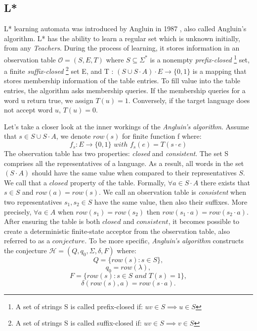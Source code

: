 \subsection{L*}
L* learning automata was introduced by Angluin in 1987 \cite{ANGLUIN198787},
also called Angluin's algorithm.
L* has the ability to learn a 
regular set which is unknown initially, from any \textit{Teachers}.
During the process of learning, it stores
information in an observation table 
$\mathcal{O} = (S, E, T)$ where $S \subseteq \Sigma^*$ is a nonempty
\textit{prefix-closed} \footnote{A set of strings S is called prefix-closed if: $uv \in S \implies u \in S$} set, 
a finite \textit{suffix-closed} \footnote{A set of strings S is called suffix-closed if: $uv \in S \implies v \in S$} set E,
and T : $(S \cup S \cdot A) \cdot E \rightarrow \lbrace 0, 1 \rbrace$ 
is a mapping that stores membership information of the table entries.
To fill value into the table entries, the algorithm asks membership queries. 
If the membership queries for a word u return true, we assign $T(u) = 1$. 
Conversely, if the target language does not accept word $u$, $T(u) = 0$.

Let's take a closer look at the inner workings of the \textit{Angluin's algorithm}.
Assume that $s \in S \cup S \cdot A$, we denote $row(s)$ for finite function f where:
\[
  f_s : E \rightarrow \lbrace 0, 1 \rbrace \,\, with \,\, f_s(e) = T(s \cdot e)  
\]
The observation table has two properties: \textit{closed} and \textit{consistent}.
The set S comprises all the representatives of a language. 
As a result, all words in the set $(S \cdot A)$ should have the same value when compared to their representatives $S$.
We call that a $closed$ property of the table.
Formally, $\forall a \in S \cdot A$ there exists that $s \in S $ and $row(a) = row(s)$.
We call an observation table is \textit{consistent} when two representatives $s_1, s_2 \in S$
have the same value, then also their suffixes.
More precisely, $\forall a \in A$ when $row(s_1) = row(s_2)$ then $row(s_1 \cdot a) = row(s_2 \cdot a)$.
After ensuring the table is both $closed$ and $consistent$, it becomes possible to create a deterministic finite-state acceptor from the observation table, also referred to as a $conjecture$.
To be more specific, \textit{Angluin's algorithm} constructs the conjecture 
$\mathcal{H} = (Q, q_0, \Sigma, \delta, F)$ where:
\[
  Q = \lbrace row(s): s \in S \rbrace,
\]
\[
  q_0 = row(\lambda),
\]
\[
  F = \lbrace row(s): s \in S \,\, and \,\, T(s)  = 1\rbrace,
\]
\[
  \delta(row(s),a) = row(s \cdot a).
\]

